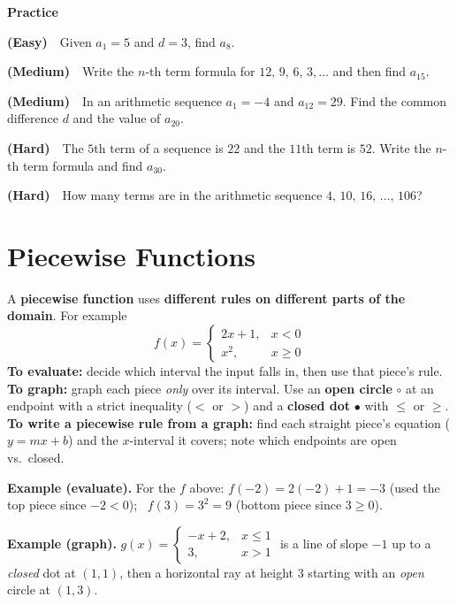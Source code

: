 \documentclass[11pt]{article}
\newcommand{\easy}{{\small\color{FangGreen}\textbf{(Easy)}}}
\newcommand{\med}{{\small\color{FangOrange}\textbf{(Medium)}}}
\newcommand{\hard}{{\small\color{FangAccent}\textbf{(Hard)}}}
\begin{document}
\textbf{Practice}
\begin{practice}
  \item \easy\ \ Given $a_1 = 5$ and $d = 3$, find $a_8$.
  \item \med\ \ Write the $n$-th term formula for $12,\,9,\,6,\,3,\dots$ and then find $a_{15}$.
  \item \med\ \ In an arithmetic sequence $a_1 = -4$ and $a_{12} = 29$. Find the common difference $d$ and the value of $a_{20}$.
  \item \hard\ \ The $5$th term of a sequence is $22$ and the $11$th term is $52$. Write the $n$-th term formula and find $a_{30}$.
  \item \hard\ \ How many terms are in the arithmetic sequence $4,\,10,\,16,\,\dots,\,106$?
\end{practice}

\section{Piecewise Functions}

\begin{summary}
A \textbf{piecewise function} uses \textbf{different rules on different parts of the domain}. For example
\[
f(x)=\begin{cases}
2x+1, & x<0\\[2pt]
x^2, & x\ge 0
\end{cases}
\]
\textbf{To evaluate:} decide which interval the input falls in, then use that piece's rule.\\
\textbf{To graph:} graph each piece \emph{only} over its interval. Use an \textbf{open circle} $\circ$ at an
endpoint with a strict inequality ($<$ or $>$) and a \textbf{closed dot} $\bullet$ with $\le$ or $\ge$.\\
\textbf{To write a piecewise rule from a graph:} find each straight piece's equation ($y=mx+b$) and the
$x$-interval it covers; note which endpoints are open vs.\ closed.
\end{summary}

\begin{example}
\textbf{Example (evaluate).} For the $f$ above:
$f(-2)=2(-2)+1=-3$ (used the top piece since $-2<0$); \ $f(3)=3^2=9$ (bottom piece since $3\ge 0$).

\smallskip
\textbf{Example (graph).} $g(x)=\begin{cases}-x+2,& x\le 1\\ 3,& x>1\end{cases}$ is a line of slope $-1$ up to a
\emph{closed} dot at $(1,1)$, then a horizontal ray at height $3$ starting with an \emph{open} circle at $(1,3)$.
\end{example}
\end{document}
